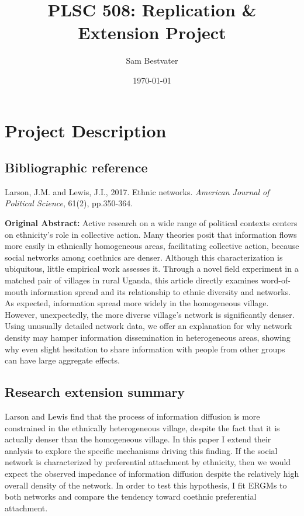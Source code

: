 \documentclass[]{article}
\title{PLSC 508: Replication \& Extension Project}
\author{Sam Bestvater}
\date{\today}
\begin{document}
\maketitle

\section{Project Description}

\subsection{Bibliographic reference}

Larson, J.M. and Lewis, J.I., 2017. Ethnic networks. \emph{American Journal of Political Science}, 61(2), pp.350-364.

\textbf{Original Abstract:} Active research on a wide range of political contexts centers on ethnicity's role in collective action. Many theories posit that information flows more easily in ethnically homogeneous areas, facilitating collective action, because social networks among coethnics are denser. Although this characterization is ubiquitous, little empirical work assesses it. Through a novel field experiment in a matched pair of villages in rural Uganda, this article directly examines word-of-mouth information spread and its relationship to ethnic diversity and networks. As expected, information spread more widely in the homogeneous village. However, unexpectedly, the more diverse village's network is significantly denser. Using unusually detailed network data, we offer an explanation for why network density may hamper information dissemination in heterogeneous areas, showing why even slight hesitation to share information with people from other groups can have large aggregate effects.


\subsection{Research extension summary}
\nocite{LarsonLewis_2017}
Larson and Lewis find that the process of information diffusion is more constrained in the ethnically heterogeneous village, despite the fact that it is actually denser than the homogeneous village. In this paper I extend their analysis to explore the specific mechanisms driving this finding. If the social network is characterized by preferential attachment by ethnicity, then we would expect the observed impedance of information diffusion despite the relatively high overall density of the network. In order to test this hypothesis, I fit ERGMs to both networks and compare the tendency toward coethnic preferential attachment.
\end{document}
